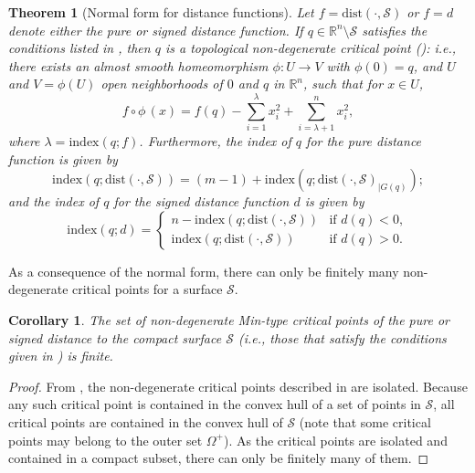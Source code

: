 \documentclass[11pt]{article}
\newcommand{\R}{\mathbb{R}}
\newcommand{\W}{\Omega}
\newcommand{\idx}{\mathrm{index}}
\newcommand{\dist}{\mathrm{dist}}
\newcommand{\Surf}{\mathcal{S}}
\theoremstyle{plain}
\newtheorem{thm}{Theorem}
\newtheorem{cor}{Corollary}
\theoremstyle{definition}
\theoremstyle{remark}
\begin{document}
\begin{thm}[Normal form for distance functions]
	\label{thm:normal_form_dist}
	Let $f = \dist(\cdot, \Surf)$ or $f = d$ denote either the pure or signed distance function. If $q \in \R^n \setminus \Surf$ satisfies the conditions listed in , then $q$ is a topological non-degenerate critical point (): i.e., there exists an almost smooth homeomorphism $\phi : U \to V$ with $\phi(0) = q$, and $U$ and $V = \phi(U)$ open neighborhoods of $0$ and $q$ in $\R^n$, such that for $x \in U$,
	\[ f \circ \phi \,(x) = f(q) - \sum_{i = 1}^{\lambda} x_i^2 + \sum_{i = \lambda + 1}^{n} x_i^2,\]
	where $\lambda = \idx(q; f)$. 
 Furthermore, the index of $q$ for the pure distance function is given by
\begin{equation}
\label{eq:idx_crit_pure}
\idx{(q; \dist(\cdot, \Surf))} = (m-1) + \idx{(q; \dist(\cdot, \Surf)_{|G(q)})};
\end{equation}
 and the index of $q$ for the signed distance function $d$ is given by
 \begin{equation}
\idx(q;d) =	\begin{cases}
		n - \idx{(q; \dist(\cdot, \Surf))} &\text{if } d(q) < 0, \\
		\idx{(q; \dist(\cdot, \Surf))} &\text{if } d(q) > 0.
	\end{cases}
\end{equation}
\end{thm}

As a consequence of the normal form, there can only be finitely many non-degenerate critical points for a surface $\Surf$. 

\begin{cor} \label{cor:mintype_ndg_finite} The set of non-degenerate Min-type critical points of the pure or signed distance to the compact surface $\Surf$ (i.e., those that satisfy the conditions given in ) is finite. 
\end{cor}

\begin{proof}
From , the non-degenerate critical points described in  are isolated. Because any such critical point is contained in the convex hull of a set of points in $\Surf$, all critical points are contained in the convex hull of $\Surf$ (note that some critical points may belong to the outer set $\W^+$). As the critical points are isolated and contained in a compact subset, there can only be finitely many of them.
\end{proof}
\end{document}
